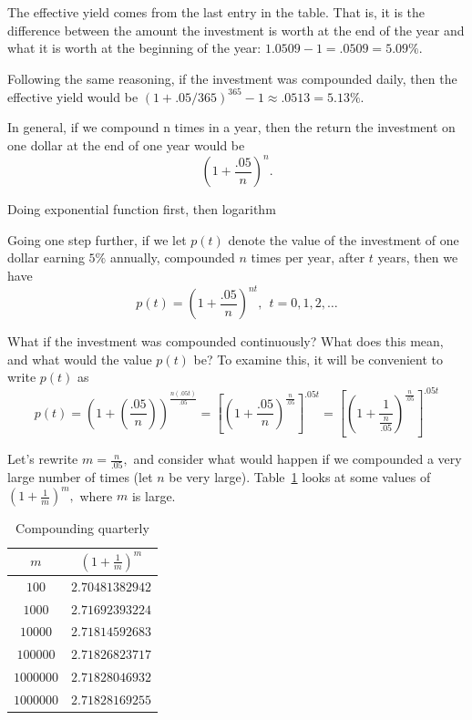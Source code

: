 The effective yield comes from the last entry in the table.  That is,
it is the difference between the amount the investment is worth at the
end of the year and what it is worth at the beginning of the year:
$1.0509-1=.0509=5.09\%.$

Following the same reasoning, if the investment was compounded daily,
then the effective yield would be $(1+.05/365)^{365}-1\approx.0513=5.13\%.$   

In general, if we compound n times in a year, then the return the
investment on one dollar at the end of one year would be
$$
\left(1+\frac{.05}{n}\right)^n.
$$

  Doing exponential function first, then
logarithm

Going one step further, if we let $p(t)$ denote the value of the investment of one dollar earning $5\%$ annually, compounded $n$ times per year, after $t$ years, then we have
$$
p(t)=\left(1+\frac{.05}{n}\right)^{nt}, \ \ t=0,1,2,\ldots
$$

What if the investment was compounded continuously?  What does this
mean, and what would the value $p(t)$ be?  To examine this, it will be
convenient to write $p(t)$ as
$$
p(t)=\left(1+\left(\frac{.05}{n}\right)\right)^{\frac{n(.05t)}{.05}}
=\left[\left(1+\frac{.05}{n}\right)^{\frac{n}{.05}}\right]^{.05t}
=\left[\left(1+\frac{1}{\frac{n}{.05}}\right)^{\frac{n}{.05}}\right]^{.05t}
$$

Let’s rewrite $m=\frac{n}{.05},$ and consider what would happen if we
compounded a very large number of times (let $n$ be very large).
Table~\ref{tab:4} looks at some values of
$\left(1+\frac{1}{m}\right)^m,$ where $m$ is large.
\begin{table}[h]
  \centering
  \begin{tabular}{|c|c|}\hline{}
     $m$        & $\left(1+\frac{1}{m}\right)^m$\\\hline
    $100$       & $2.70481382942$ \\\hline
    $1000$      & $2.71692393224$ \\\hline
    $10000$     & $2.71814592683$ \\\hline
    $100000$    & $2.71826823717$ \\\hline
    $1000000$   & $2.71828046932$ \\\hline
    $1000000$   & $2.71828169255$ \\\hline
  \end{tabular}
  \caption{Compounding quarterly}
  \label{tab:4}
\end{table}

